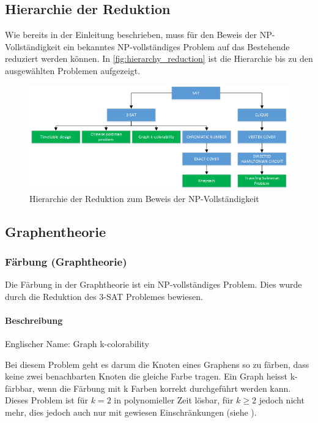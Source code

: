 \subsection{Hierarchie der Reduktion}\label{hierarchy_reduction}
Wie bereits in der Einleitung beschrieben, muss für den Beweis der NP-Vollständigkeit ein bekanntes NP-vollständiges Problem auf das Bestehende reduziert werden können. In \autoref{fig:hierarchy_reduction} ist die Hierarchie bis zu den ausgewählten Problemen aufgezeigt.

\begin{figure}[h]
\centering 
\includegraphics[scale=0.8]{images/visio/problem_hierarchy.png}
\caption{Hierarchie der Reduktion zum Beweis der NP-Vollständigkeit}
\label{fig:hierarchy_reduction}
\end{figure}

\newpage
\subsection{Graphentheorie}\label{graph_theory}

	\subsubsection{Färbung (Graphtheorie)}\label{colarability_graph_theory}
	Die Färbung in der Graphtheorie ist ein NP-vollständiges Problem. Dies wurde durch die Reduktion des 3-SAT Problemes bewiesen.

	\paragraph{Beschreibung}
	Englischer Name: Graph k-colorability

	Bei diesem Problem geht es darum die Knoten eines Graphens so zu färben, dass keine zwei benachbarten Knoten die gleiche Farbe tragen. Ein Graph heisst k-färbbar, wenn die Färbung mit k Farben korrekt durchgeführt werden kann. Dieses Problem ist für $k = 2$ in polynomieller Zeit lösbar, für $k \ge 2$ jedoch nicht mehr, dies jedoch auch nur mit gewiesen Einschränkungen (siehe \cite{garey1979computers}).

